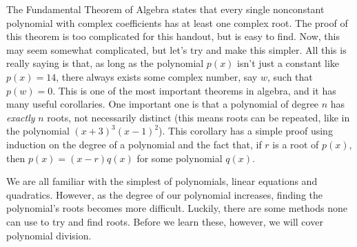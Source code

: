 \documentclass[12pt]{article}
\begin{document}
\begin{tcolorbox}[colback=blue!10!white, colframe=blue!50!black, title=The Fundamental Theorem of Algebra]
    The Fundamental Theorem of Algebra states that every single nonconstant polynomial with complex coefficients has at least one complex root. The proof of this theorem is too complicated for this handout, but is easy to find. Now, this may seem somewhat complicated, but let's try and make this simpler. All this is really saying is that, as long as the polynomial $p(x)$ isn't just a constant like $p(x)=14$, there always exists some complex number, say $w$, such that $p(w)=0$.
    \tcblower
    This is one of the most important theorems in algebra, and it has many useful corollaries. One important one is that a polynomial of degree $n$ has \textit{exactly} $n$ roots, not necessarily distinct (this means roots can be repeated, like in the polynomial $(x+3)^3(x-1)^2$). This corollary has a simple proof using induction on the degree of a polynomial and the fact that, if $r$ is a root of $p(x)$, then $p(x)= (x-r)q(x)$ for some polynomial $q(x)$.
    
\end{tcolorbox}
We are all familiar with the simplest of polynomials, linear equations and quadratics. However, as the degree of our polynomial increases, finding the polynomial's roots becomes more difficult. Luckily, there are some methods none can use to try and find roots. Before we learn these, however, we will cover polynomial division.
\end{document}
